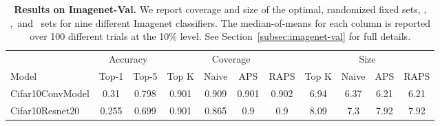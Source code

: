 \begin{table}[t] 
\centering 
\small 
\begin{tabular}{lcccccccccc} 
\toprule 
 & \multicolumn{2}{c}{Accuracy}  & \multicolumn{4}{c}{Coverage} & \multicolumn{4}{c}{Size} \\ 
\cmidrule(r){2-3}  \cmidrule(r){4-7}  \cmidrule(r){8-11} 
Model & Top-1 & Top-5 & Top K & Naive & APS & RAPS & Top K & Naive & APS & RAPS \\ 
\midrule 
 Cifar10ConvModel &  0.31 &  0.798 & 0.901 & 0.909 & 0.901 & 0.902 & 6.94 & 6.37 & 6.21 & 6.21 \\ 
 Cifar10Resnet20 &  0.255 &  0.699 & 0.901 & 0.865 & 0.9 & 0.9 & 8.09 & 7.3 & 7.92 & 7.92 \\ 
\bottomrule 
\end{tabular} 
\caption{\textbf{Results on Imagenet-Val.} We report coverage and size of the optimal, randomized fixed sets, \naive, \aps,\ and \raps\ sets for nine different Imagenet classifiers. The median-of-means for each column is reported over 100 different trials at the 10\% level. See Section~\ref{subsec:imagenet-val} for full details.} 
\label{table:imagenet-val} 
\end{table} 
